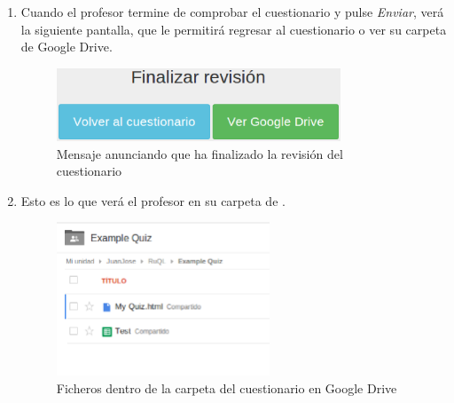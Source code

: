 \begin{enumerate}
  \item Cuando el profesor termine de comprobar el cuestionario y pulse \textit{Enviar}, ver\'a la siguiente pantalla, que le permitir\'a regresar al cuestionario o ver
  su carpeta de Google Drive.
  \begin{figure}[!th]
  \begin{center}
  \includegraphics[width=0.8\textwidth]{images/app9.eps}
  \caption{Mensaje anunciando que ha finalizado la revisi\'on del cuestionario}
  \label{fig:app9}
  \end{center}
  \end{figure}

  \item Esto es lo que ver\'a el profesor en su carpeta de .
  \begin{figure}[!th]
  \begin{center}
  \includegraphics[width=0.6\textwidth]{images/app10.eps}
  \caption{Ficheros dentro de la carpeta del cuestionario en Google Drive}
  \label{fig:app10}
  \end{center}
  \end{figure}
  \newpage


\end{enumerate}
